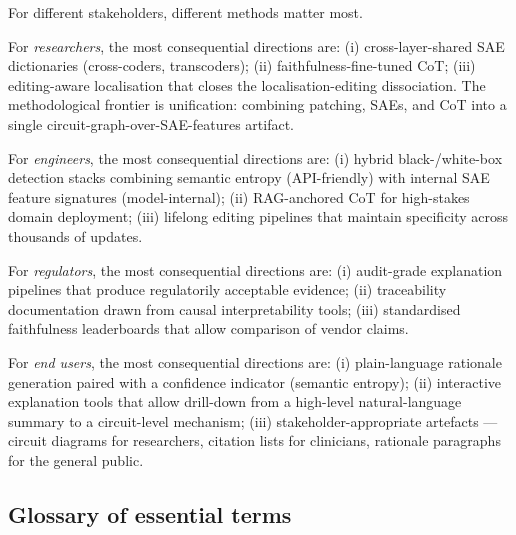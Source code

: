 \documentclass{article}
\begin{document}
For different stakeholders, different methods matter most.

For \emph{researchers}, the most consequential directions are: (i) cross-layer-shared SAE dictionaries (cross-coders, transcoders); (ii) faithfulness-fine-tuned CoT; (iii) editing-aware localisation that closes the localisation-editing dissociation. The methodological frontier is unification: combining patching, SAEs, and CoT into a single circuit-graph-over-SAE-features artifact.

For \emph{engineers}, the most consequential directions are: (i) hybrid black-/white-box detection stacks combining semantic entropy (API-friendly) with internal SAE feature signatures (model-internal); (ii) RAG-anchored CoT for high-stakes domain deployment; (iii) lifelong editing pipelines that maintain specificity across thousands of updates.

For \emph{regulators}, the most consequential directions are: (i) audit-grade explanation pipelines that produce regulatorily acceptable evidence; (ii) traceability documentation drawn from causal interpretability tools; (iii) standardised faithfulness leaderboards that allow comparison of vendor claims.

For \emph{end users}, the most consequential directions are: (i) plain-language rationale generation paired with a confidence indicator (semantic entropy); (ii) interactive explanation tools that allow drill-down from a high-level natural-language summary to a circuit-level mechanism; (iii) stakeholder-appropriate artefacts --- circuit diagrams for researchers, citation lists for clinicians, rationale paragraphs for the general public.

\subsection{Glossary of essential terms}\label{glossary-of-essential-terms}
\end{document}
